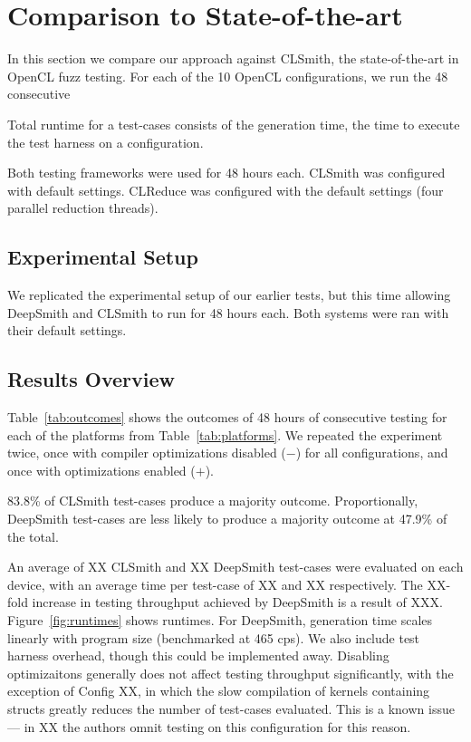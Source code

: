 \section{Comparison to State-of-the-art}\label{sec:vs_clsmith}

In this section we compare our approach against CLSmith, the state-of-the-art in OpenCL fuzz testing. For each of the 10 OpenCL configurations, we run the  48 consecutive

Total runtime for a test-cases consists of the generation time, the time to execute the test harness on a configuration.

Both testing frameworks were used for 48 hours each. CLSmith was configured with default settings. CLReduce was configured with the default settings (four parallel reduction threads).

%

\subsection{Experimental Setup}

We replicated the experimental setup of our earlier tests, but this time allowing DeepSmith and CLSmith to run for 48 hours each. Both systems were ran with their default settings.


\subsection{Results Overview}

Table~\ref{tab:outcomes} shows the outcomes of 48 hours of consecutive testing for each of the platforms from Table~\ref{tab:platforms}. We repeated the experiment twice, once with compiler optimizations disabled ($-$) for all configurations, and once with optimizations enabled ($+$).

83.8\% of CLSmith test-cases produce a majority \textbf{\cmark} outcome. Proportionally, DeepSmith test-cases are less likely to produce a majority outcome at 47.9\% of the total.

An average of XX CLSmith and XX DeepSmith test-cases were evaluated on each device, with an average time per test-case of XX and XX respectively. The XX-fold increase in testing throughput achieved by DeepSmith is a result of XXX. Figure~\ref{fig:runtimes} shows runtimes. For DeepSmith, generation time scales linearly with program size (benchmarked at 465 cps). We also include test harness overhead, though this could be implemented away. Disabling optimizaitons generally does not affect testing throughput significantly, with the exception of Config XX, in which the slow compilation of kernels containing structs greatly reduces the number of test-cases evaluated. This is a known issue --- in XX the authors omnit testing on this configuration for this reason.

